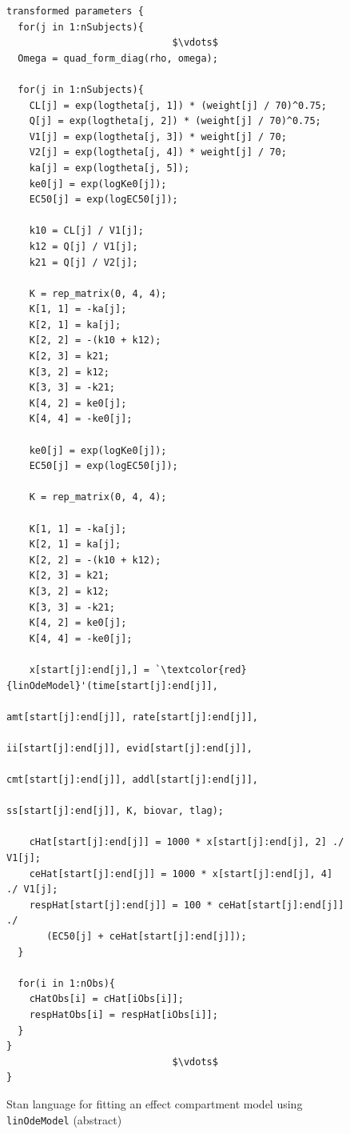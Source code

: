 \documentclass[11pt]{amsart}
\newenvironment{fmpage}[1]
     {\begin{lrbox}{\fmbox}\begin{minipage}{#1}}
     {\end{minipage}\end{lrbox}\fbox{\usebox{\fmbox}}}
\begin{document}
\begin{figure}
\caption{Stan language for fitting an effect compartment model using \texttt{linOdeModel} (abstract)}
\begin{tiny}
\begin{center}
\begin{fmpage}{\textwidth - .75in}
\begin{lstlisting}[basicstyle=\tiny\ttfamily,mathescape=true,flexiblecolumns=true,frame=single,escapeinside=`']
transformed parameters {
  for(j in 1:nSubjects){
                             $\vdots$
  Omega = quad_form_diag(rho, omega);

  for(j in 1:nSubjects){
    CL[j] = exp(logtheta[j, 1]) * (weight[j] / 70)^0.75;
    Q[j] = exp(logtheta[j, 2]) * (weight[j] / 70)^0.75;
    V1[j] = exp(logtheta[j, 3]) * weight[j] / 70;
    V2[j] = exp(logtheta[j, 4]) * weight[j] / 70;
    ka[j] = exp(logtheta[j, 5]);
    ke0[j] = exp(logKe0[j]);
    EC50[j] = exp(logEC50[j]);

    k10 = CL[j] / V1[j];
    k12 = Q[j] / V1[j];
    k21 = Q[j] / V2[j];

    K = rep_matrix(0, 4, 4);
    K[1, 1] = -ka[j];
    K[2, 1] = ka[j];
    K[2, 2] = -(k10 + k12);
    K[2, 3] = k21;
    K[3, 2] = k12;
    K[3, 3] = -k21;
    K[4, 2] = ke0[j];
    K[4, 4] = -ke0[j];
                        
    ke0[j] = exp(logKe0[j]);
    EC50[j] = exp(logEC50[j]);

    K = rep_matrix(0, 4, 4);
    
    K[1, 1] = -ka[j];
    K[2, 1] = ka[j];
    K[2, 2] = -(k10 + k12);
    K[2, 3] = k21;
    K[3, 2] = k12;
    K[3, 3] = -k21;
    K[4, 2] = ke0[j];
    K[4, 4] = -ke0[j];
           
    x[start[j]:end[j],] = `\textcolor{red}{linOdeModel}'(time[start[j]:end[j]], 
                                                 amt[start[j]:end[j]], rate[start[j]:end[j]],
                                                 ii[start[j]:end[j]], evid[start[j]:end[j]],
                                                 cmt[start[j]:end[j]], addl[start[j]:end[j]], 
                                                 ss[start[j]:end[j]], K, biovar, tlag);

    cHat[start[j]:end[j]] = 1000 * x[start[j]:end[j], 2] ./ V1[j];
    ceHat[start[j]:end[j]] = 1000 * x[start[j]:end[j], 4] ./ V1[j];
    respHat[start[j]:end[j]] = 100 * ceHat[start[j]:end[j]] ./ 
       (EC50[j] + ceHat[start[j]:end[j]]);
  }

  for(i in 1:nObs){
    cHatObs[i] = cHat[iObs[i]];
    respHatObs[i] = respHat[iObs[i]];
  }
}
                             $\vdots$  
} 
\end{lstlisting}
\end{fmpage}
\end{center}
\end{tiny} 
\label{effCptModelCode}
\end{figure}
\end{document}
